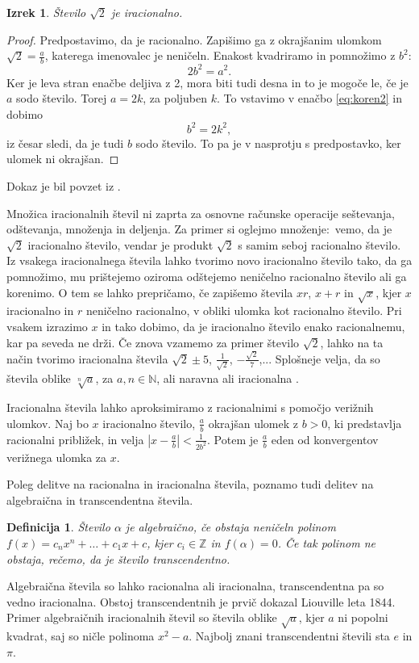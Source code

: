 \documentclass[a4paper]{article}
\theoremstyle{plain}
\newtheorem{izrek}{Izrek}
\newtheorem{definicija}{Definicija}
\begin{document}
\begin{izrek}
Število $\sqrt{2}$ je iracionalno.
\end{izrek}
\begin{proof}
Predpostavimo, da je racionalno. Zapišimo ga z okrajšanim ulomkom $\sqrt{2} = \frac{a}{b}$, katerega imenovalec je neničeln. Enakost kvadriramo in pomnožimo z $b^2$:
\begin{equation}
\label{eq:koren2}
2b^2 = a^2.
\end{equation}
Ker je leva stran enačbe deljiva z 2, mora biti tudi desna in to je mogoče le, če je $a$ sodo število. Torej $a=2k$, za poljuben $k$. To vstavimo v enačbo \eqref{eq:koren2} in dobimo
\begin{equation*}
b^2= 2k^2,
\end{equation*}
iz česar sledi, da je tudi $b$ sodo število. To pa je v nasprotju s predpostavko, ker ulomek ni okrajšan.
\end{proof}
Dokaz je bil povzet iz \cite{knjiznica}.

Množica iracionalnih števil ni zaprta za osnovne računske operacije seštevanja, odštevanja, množenja in deljenja. Za primer si oglejmo množenje:\ vemo, da je $\sqrt{2}$ iracionalno število, vendar je produkt $\sqrt{2}$ s samim seboj racionalno število. Iz vsakega iracionalnega števila lahko tvorimo novo iracionalno število tako, da ga pomnožimo, mu prištejemo oziroma odštejemo neničelno racionalno število ali ga korenimo. O tem se lahko prepričamo, če zapišemo števila $xr$, $x+r$ in $\sqrt{x}$, kjer $x$ iracionalno in $r$ neničelno racionalno, v obliki ulomka kot racionalno število. Pri vsakem izrazimo $x$ in tako dobimo, da je iracionalno število enako racionalnemu, kar pa seveda ne drži. Če znova vzamemo za primer število $\sqrt{2}$, lahko na ta način tvorimo iracionalna števila $\sqrt{2}\pm 5$, $\frac{1}{\sqrt{2}}$, $-\frac{\sqrt{2}}{7}$,... Splošneje velja, da so števila oblike $\sqrt[n]{a}$, za $a,n\in\mathbb{N}$, ali naravna ali iracionalna \cite{spletnaknjiga}. 

Iracionalna števila lahko aproksimiramo z racionalnimi s pomočjo verižnih ulomkov. Naj bo $x$ iracionalno število, $\frac{a}{b}$ okrajšan ulomek z $b>0$, ki predstavlja racionalni približek, in velja $|x-\frac{a}{b}|<\frac{1}{2b^2}$. Potem je $\frac{a}{b}$ eden od konvergentov verižnega ulomka za $x$.

Poleg delitve na racionalna in iracionalna števila, poznamo tudi delitev na algebraična in transcendentna števila.
\begin{definicija}
Število $\alpha$ je algebraično, če obstaja neničeln polinom $f(x)=c_nx^n+\dots+c_1x+c$, kjer $c_i\in\mathbb{Z}$ in $f(\alpha)=0$. Če tak polinom ne obstaja, rečemo, da je število transcendentno.
\end{definicija}
Algebraična števila so lahko racionalna ali iracionalna, transcendentna pa so vedno iracionalna. Obstoj transcendentnih je prvič dokazal Liouville leta 1844. Primer algebraičnih iracionalnih števil so števila oblike $\sqrt{a}$, kjer $a$ ni popolni kvadrat, saj so ničle polinoma $x^2-a$. Najbolj znani transcendentni števili sta $e$ in $\pi$.
\end{document}
